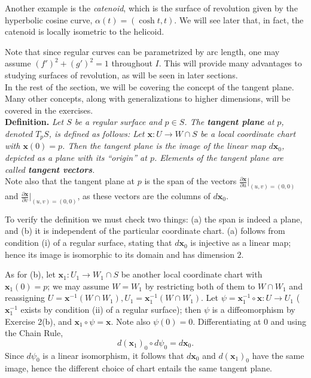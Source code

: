 \documentclass[leqno]{book}
\begin{document}
Another example is the \emph{catenoid}, which is the surface of revolution given by the hyperbolic cosine curve, $\alpha(t)=(\cosh t,t)$.  We will see later that, in fact, the catenoid is locally isometric to the helicoid.

Note that since regular curves can be parametrized by arc length, one may assume $(f')^2+(g')^2=1$ throughout $I$.  This will provide many advantages to studying surfaces of revolution, as will be seen in later sections.\\

\noindent In the rest of the section, we will be covering the concept of the tangent plane.  Many other concepts, along with generalizations to higher dimensions, will be covered in the exercises.\\

\noindent\textbf{Definition.} \emph{Let $S$ be a regular surface and $p\in S$.  The \textbf{tangent plane} at $p$, denoted $T_pS$, is defined as follows: Let $\mathbf x:U\to W\cap S$ be a local coordinate chart with $\mathbf x(0)=p$.  Then the tangent plane is the image of the linear map $d\mathbf x_0$, depicted as a plane with its ``origin'' at $p$.  Elements of the tangent plane are called \textbf{tangent vectors}.}\\

\noindent Note also that the tangent plane at $p$ is the span of the vectors $\frac{\partial\mathbf x}{\partial u}\big|_{(u,v)=(0,0)}$ and $\frac{\partial\mathbf x}{\partial v}\big|_{(u,v)=(0,0)}$, as these vectors are the columns of $d\mathbf x_0$.

To verify the definition we must check two things: (a) the span is indeed a plane, and (b) it is independent of the particular coordinate chart.  (a) follows from condition (i) of a regular surface, stating that $d\mathbf x_0$ is injective as a linear map; hence its image is isomorphic to its domain and has dimension $2$.

As for (b), let $\mathbf x_1:U_1\to W_1\cap S$ be another local coordinate chart with $\mathbf x_1(0)=p$; we may assume $W=W_1$ by restricting both of them to $W\cap W_1$ and reassigning $U=\mathbf x^{-1}(W\cap W_1),U_1=\mathbf x_1^{-1}(W\cap W_1)$.  Let $\psi=\mathbf x_1^{-1}\circ\mathbf x:U\to U_1$ ($\mathbf x_1^{-1}$ exists by condition (ii) of a regular surface); then $\psi$ is a diffeomorphism by Exercise 2(b), and $\mathbf x_1\circ\psi=\mathbf x$.  Note also $\psi(0)=0$.  Differentiating at $0$ and using the Chain Rule,
$$d(\mathbf x_1)_0\circ d\psi_0=d\mathbf x_0.$$
Since $d\psi_0$ is a linear isomorphism, it follows that $d\mathbf x_0$ and $d(\mathbf x_1)_0$ have the same image, hence the different choice of chart entails the same tangent plane.\\
\end{document}
